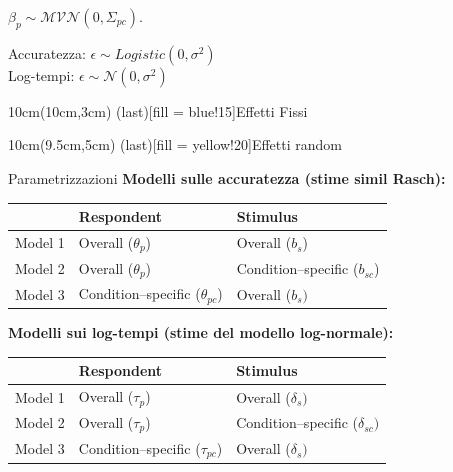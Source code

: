 \documentclass[compress]{beamer}
\begin{document}
\begin{frame}
\begin{centering}
	\end{centering}
	
	\begin{centering}
		
		$\beta_p \sim \mathcal{MVN}(0, \Sigma_{pc})$.
		
	\end{centering}
	
	
	\vspace{3mm}
	
	\footnotesize{Accuratezza: $\epsilon \sim Logistic (0, \sigma^2)$ \\ Log-tempi: $\epsilon \sim \mathcal{N} (0, \sigma^2)$}
	
	
	
		\begin{textblock*}{10cm}(10cm,3cm)
			\spot(last)[fill = blue!15]{Effetti Fissi}
		\end{textblock*}
	\begin{textblock*}{10cm}(9.5cm,5cm)
		\spot(last)[fill = yellow!20]{Effetti random}
	\end{textblock*}
\end{frame}

\begin{frame}{Parametrizzazioni}
	\vspace{5mm}
	{\textcolor{rasch}{\textbf{Modelli sulle accuratezza (stime simil Rasch):}}}
	\vspace{2mm}
	\begin{table}
		\centering
		\begin{tabular}{l l l}
			\hline
			& \textbf{Respondent} & \textbf{Stimulus}\\
			\hline				
			
			Model 1  & 	 Overall ($\theta_p$) & Overall ($b_s$) \\		
			Model 2 & Overall ($\theta_p$) & Condition--specific ($b_{sc}$)\\
			Model 3 &Condition--specific ($\theta_{pc}$)  & Overall ($b_s)$ \\
			\hline
		\end{tabular}
	\end{table}
	
	\vspace{3mm}
	{\textcolor{log}{{\textbf{Modelli sui log-tempi (stime del modello log-normale):}}}}
	\vspace{2mm}
	\begin{table}
		\centering
		\begin{tabular}{l l l}
			\hline
			& \textbf{Respondent} & \textbf{Stimulus}\\
			\hline					 
			Model 1  & Overall  ($\tau_p$) & Overall ($\delta_s)$ \\	
			Model 2 & Overall ($\tau_p$) & Condition--specific ($\delta_{sc})$ \\
			Model 3 & Condition--specific ($\tau_{pc}$) & Overall ($\delta_s)$ \\
			\hline
		\end{tabular}
	\end{table}
\end{frame}
\end{document}
